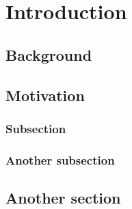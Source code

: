 \chapter{Introduction}\label{introduction}

\section{Background}

\section{Motivation}


\subsection{Subsection}
 

\subsection{Another subsection} 

\section{Another section}
